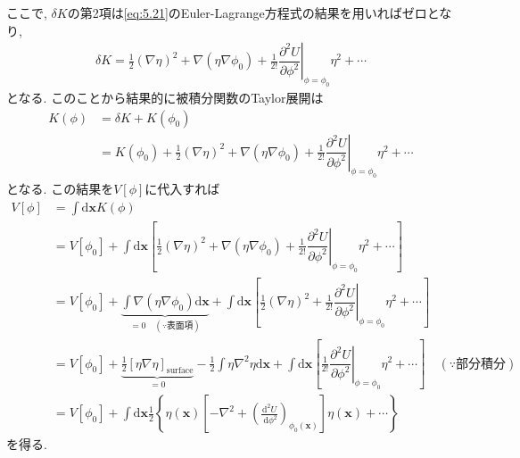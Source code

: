 \documentclass[dvipdfmx,11pt,a4paper,oneside,openany]{jsbook}
\begin{document}
ここで, $\delta K$の第2項は\eqref{eq:5.21}のEuler-Lagrange方程式の結果を用いればゼロとなり,
\begin{align*}
    \delta K=\frac{1}{2}(\nabla\eta)^2+\nabla(\eta\nabla\phi_0)+\frac{1}{2!}\left.\dfrac{\partial^2 U}{\partial \phi^2}\right|_{\phi=\phi_0}\eta^2+\cdots
\end{align*}
となる. このことから結果的に被積分関数のTaylor展開は
\begin{align*}
    K(\phi) & =\delta K+K(\phi_0)                                                                                                                                     \\
            & =K(\phi_0)+\frac{1}{2}(\nabla\eta)^2+\nabla(\eta\nabla\phi_0)+\frac{1}{2!}\left.\dfrac{\partial^2 U}{\partial \phi^2}\right|_{\phi=\phi_0}\eta^2+\cdots
\end{align*}
となる. この結果を$V[\phi]$に代入すれば
\begin{align}
    V[\phi] & =\int\mathrm{d}\bm{x} K(\phi)\nonumber                                                                                                                                                                                                                                                                               \\
            & =V[\phi_0]+\int\mathrm{d}\bm{x}\left[\frac{1}{2}(\nabla\eta)^2+\nabla(\eta\nabla\phi_0)+\frac{1}{2!}\left.\dfrac{\partial^2 U}{\partial \phi^2}\right|_{\phi=\phi_0}\eta^2+\cdots\right] \nonumber                                                                                                                   \\
            & =V[\phi_0]+\underbrace{\int\nabla(\eta\nabla\phi_0)\mathrm{d}\bm{x}}_{=0\quad (\because \text{表面項})}+\int\mathrm{d}\bm{x}\left[\frac{1}{2}(\nabla\eta)^2+\frac{1}{2!}\left.\dfrac{\partial^2 U}{\partial \phi^2}\right|_{\phi=\phi_0}\eta^2+\cdots\right]\nonumber                                                \\
            & =V[\phi_0]+\underbrace{\frac{1}{2}\left[\eta\nabla\eta\right]_{\text{surface}}}_{=0}-\frac{1}{2}\int\eta\nabla^2\eta\mathrm{d}\bm{x}+\int\mathrm{d}\bm{x}\left[\frac{1}{2!}\left.\dfrac{\partial^2 U}{\partial \phi^2}\right|_{\phi=\phi_0}\eta^2+\cdots\right]\quad \left(\because \text{部分積分}\right) \nonumber \\
            & =V\left[\phi_{0}\right]+\int \mathrm{d} \bm{x} \frac{1}{2}\left\{\eta(\boldsymbol{x})\left[-\nabla^{2}+\left(\frac{\mathrm{d}^{2} U}{\mathrm{~d} \phi^{2}}\right)_{\phi_{0}(\boldsymbol{x})}\right] \eta(\boldsymbol{x})+\cdots\right\}
\end{align}
を得る.




\end{document}
